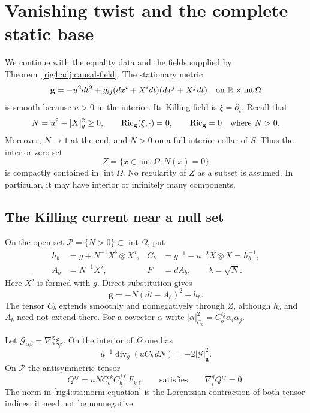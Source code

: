 \section{Vanishing twist and the complete static base}\label{rig4:sta:section}

We continue with the equality data and the fields supplied by
Theorem~\ref{rig4:adj:causal-field}. The stationary metric
\[
 \mathbf g=-u^2dt^2+g_{ij}(dx^i+X^i dt)(dx^j+X^j dt)
 \quad\text{on }\mathbb R\times\operatorname{int}\Omega
\]
is smooth because $u>0$ in the interior. Its Killing field is
$\xi=\partial_t$. Recall that
\[
 N=u^2-|X|_g^2\ge0,\qquad
 \operatorname{Ric}_{\mathbf g}(\xi,\cdot)=0,
 \qquad \operatorname{Ric}_{\mathbf g}=0\quad\text{where }N>0.
\]
Moreover, $N\to1$ at the end, and $N>0$ on a full interior collar
of $S$. Thus the interior zero set
\[
 Z=\{x\in\operatorname{int}\Omega:N(x)=0\}
\]
is compactly contained in $\operatorname{int}\Omega$. No regularity of
$Z$ as a subset is assumed. In particular, it may have interior or
infinitely many components.

\subsection{The Killing current near a null set}

On the open set $\mathcal P=\{N>0\}\subset\operatorname{int}\Omega$, put
\begin{equation}\label{rig4:sta:base-variables}
 \begin{aligned}
 h_b&=g+N^{-1}X^\flat\otimes X^\flat,
 & C_b&=g^{-1}-u^{-2}X\otimes X=h_b^{-1},\\
 A_b&=N^{-1}X^\flat,
 & F&=dA_b,\qquad \lambda=\sqrt N .
 \end{aligned}
\end{equation}
Here $X^\flat$ is formed with $g$. Direct substitution gives
\begin{equation}\label{rig4:sta:stationary-decomposition}
 \mathbf g=-N(dt-A_b)^2+h_b.
\end{equation}
The tensor $C_b$ extends smoothly and nonnegatively through $Z$, although
$h_b$ and $A_b$ need not extend there. For a covector $\alpha$ write
$|\alpha|_{C_b}^2=C_b^{ij}\alpha_i\alpha_j$.

\begin{lemma}\label{rig4:sta:current-identities}
Let $\mathcal G_{\alpha\beta}=\nabla^{\mathbf g}_\alpha\xi_\beta$.
On the interior of $\Omega$ one has
\begin{equation}\label{rig4:sta:norm-equation}
 u^{-1}\operatorname{div}_g(uC_b\,dN)
       =-2|\mathcal G|_{\mathbf g}^2.
\end{equation}
On $\mathcal P$ the antisymmetric tensor
\begin{equation}\label{rig4:sta:killing-current}
 Q^{ij}=uN C_b^{ik}C_b^{j\ell}F_{k\ell}
 \qquad\text{satisfies}\qquad \nabla^g_iQ^{ij}=0.
\end{equation}
The norm in \eqref{rig4:sta:norm-equation} is the Lorentzian contraction of
both tensor indices; it need not be nonnegative.
\end{lemma}

